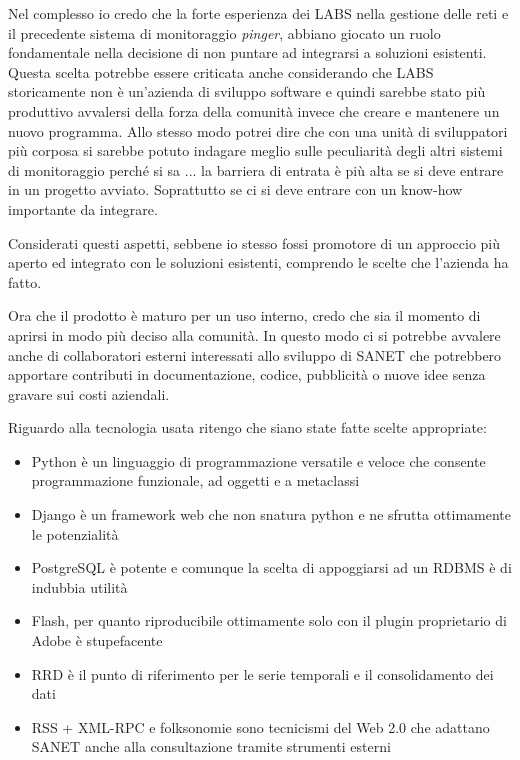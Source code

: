 \documentclass[a4wide,10pt,italian]{manual}
\begin{document}
Nel complesso io credo che la forte esperienza dei LABS nella gestione delle reti e il
precedente sistema di monitoraggio \emph{pinger}, abbiano giocato un ruolo fondamentale nella
decisione di non puntare ad integrarsi a soluzioni esistenti.
Questa scelta potrebbe essere criticata anche considerando che LABS storicamente non è un'azienda
di sviluppo software e quindi sarebbe stato più produttivo avvalersi della forza della comunità
invece che creare e mantenere un nuovo programma.
Allo stesso modo potrei dire che con una unità di sviluppatori più corposa si sarebbe potuto indagare meglio
sulle peculiarità degli altri sistemi di monitoraggio perché si sa ...
la barriera di entrata è più alta se si deve entrare in un progetto avviato.
Soprattutto se ci si deve entrare con un know-how importante da integrare.

Considerati questi aspetti, sebbene io stesso fossi promotore di un approccio più aperto
ed integrato con le soluzioni esistenti, comprendo le scelte che l'azienda ha fatto.

Ora che il prodotto è maturo per un uso interno, credo che sia il momento di aprirsi in modo
più deciso alla comunità. In questo modo ci si potrebbe avvalere anche di collaboratori esterni interessati allo sviluppo
di SANET che potrebbero apportare contributi in documentazione, codice, pubblicità o nuove idee senza gravare sui costi aziendali.

Riguardo alla tecnologia usata ritengo che siano state fatte scelte appropriate:
\begin{itemize}
\item {} 
Python è un linguaggio di programmazione versatile e veloce che consente programmazione funzionale, ad oggetti e a metaclassi

\item {} 
Django è un framework web che non snatura python e ne sfrutta ottimamente le potenzialità

\item {} 
PostgreSQL è potente e comunque la scelta di appoggiarsi ad un RDBMS è di indubbia utilità

\item {} 
Flash, per quanto riproducibile ottimamente solo con il plugin proprietario di Adobe è stupefacente

\item {} 
RRD è il punto di riferimento per le serie temporali e il consolidamento dei dati

\item {} 
RSS + XML-RPC e folksonomie sono tecnicismi del Web 2.0 che adattano SANET anche alla consultazione tramite strumenti esterni

\end{itemize}
\end{document}

